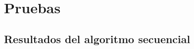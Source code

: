 \section{Pruebas}


\subsection{Resultados del algoritmo secuencial}
\label{sec:Resultados del algoritmo secuencial}
